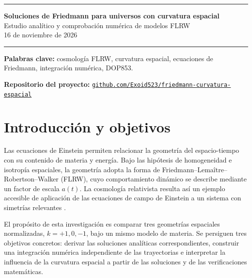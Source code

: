 \documentclass[letterpaper,11pt]{article}
\newcommand{\titulotarea}{Soluciones de Friedmann para universos con curvatura espacial}
\newcommand{\fechatarea}{16 de noviembre de 2026}
\newcommand{\encabezadotarea}{%
  \pagestyle{continuacion}
  \thispagestyle{tarea}
  \hrule height 1.3pt
  \vspace{0.18cm}
  \begin{center}
    {\Large\bfseries \titulotarea}\\[0.05cm]
    {\small Estudio analítico y comprobación numérica de modelos FLRW}\\[0.05cm]
    {\small \fechatarea}
  \end{center}
  \vspace{0.18cm}
  \hrule height 1.3pt
  \vspace{0.22cm}
}
\begin{document}
\encabezadotarea

\begin{abstract}
\noindent
Se estudian soluciones de las ecuaciones de Friedmann para universos homogéneos e isótropos con curvatura espacial positiva, nula y negativa. Para aislar el papel del parámetro de curvatura se adopta un fluido de materia sin presión y constante cosmológica nula. Se obtienen la solución de potencia del modelo plano y las soluciones paramétricas de los modelos cerrado y abierto; posteriormente se integran las ecuaciones adimensionales mediante el método DOP853 de SciPy. La comparación entre soluciones exactas y numéricas arroja errores absolutos máximos entre $10^{-9}$ y $10^{-12}$, mientras que la restricción de Friedmann permanece satisfecha con residuos pequeños. Se discuten los resultados físicos, las verificaciones realizadas y las limitaciones de estos modelos idealizados.
\end{abstract}
\textbf{Palabras clave:} cosmología FLRW, curvatura espacial, ecuaciones de Friedmann, integración numérica, DOP853.

\par\smallskip
\noindent\textbf{Repositorio del proyecto:}
\href{https://github.com/Exoid523/friedmann-curvatura-espacial}
{\texttt{github.com/Exoid523/friedmann-curvatura-espacial}}

\section{Introducción y objetivos}

Las ecuaciones de Einstein permiten relacionar la geometría del espacio-tiempo con su contenido de materia y energía. Bajo las hipótesis de homogeneidad e isotropía espaciales, la geometría adopta la forma de Friedmann--Lemaître--Robertson--Walker (FLRW), cuyo comportamiento dinámico se describe mediante un factor de escala $a(t)$. La cosmología relativista resulta así un ejemplo accesible de aplicación de las ecuaciones de campo de Einstein a un sistema con simetrías relevantes \cite{janssen2013,carroll2004,weinberg1972}.

El propósito de esta investigación es comparar tres geometrías espaciales normalizadas, $k=+1,0,-1$, bajo un mismo modelo de materia. Se persiguen tres objetivos concretos: derivar las soluciones analíticas correspondientes, construir una integración numérica independiente de las trayectorias e interpretar la influencia de la curvatura espacial a partir de las soluciones y de las verificaciones matemáticas.
\end{document}
